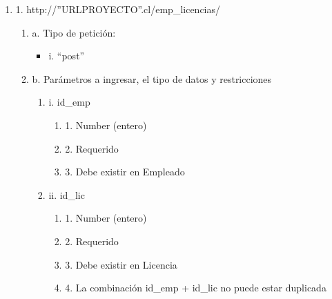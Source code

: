 \begin{enumerate}
    \item 1. http://”URLPROYECTO”.cl/emp\_licencias/
    \begin{enumerate}
        \item a. Tipo de petición:
            \begin{itemize}
               \item i. “post”
            \end{itemize}
        \item b. Parámetros a ingresar, el tipo de datos y restricciones
            \begin{enumerate}
                \item i. id\_emp
                    \begin{enumerate}
                        \item 1. Number (entero)
                        \item 2. Requerido
                        \item 3. Debe existir en Empleado
                    \end{enumerate}
                \item ii. id\_lic
                    \begin{enumerate}
                        \item 1. Number (entero)
                        \item 2. Requerido
                        \item 3. Debe existir en Licencia
                        \item 4. La combinación id\_emp + id\_lic no puede estar duplicada
                    \end{enumerate}
            \end{enumerate}
    \end{enumerate}


\end{enumerate}
